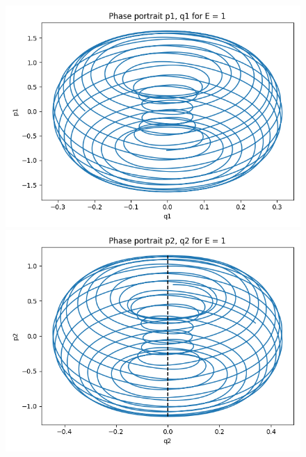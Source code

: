 \documentclass[a4paper,12pt]{article}
\begin{document}
\begin{figure}[!ht]
  \centering
  \begin{minipage}{0.45\textwidth}
    \includegraphics[width=\textwidth]{img/5-p1q1-1.png}
  \end{minipage}
  \begin{minipage}{0.45\textwidth}
    \includegraphics[width=\textwidth]{img/5-p2q2-1.png}
  \end{minipage}
\end{figure}
\end{document}
